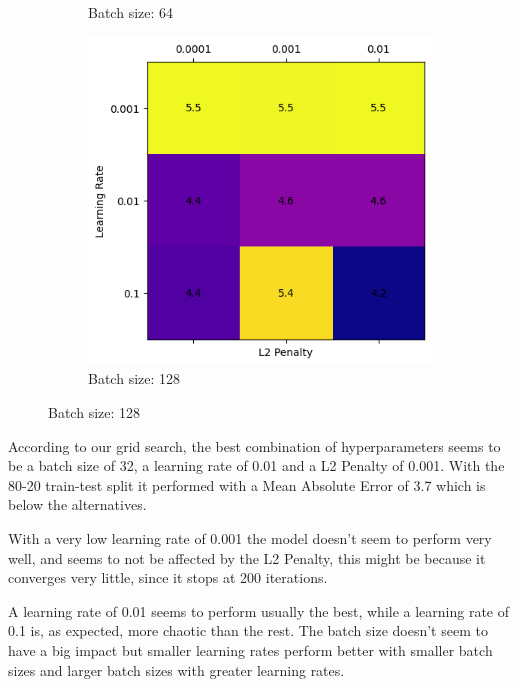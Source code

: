 \documentclass{article}
\begin{document}
\begin{enumerate}[leftmargin=\labelsep,resume]
\begin{figure}[H]
\begin{subfigure}{0.3\linewidth}
      \caption{Batch size: 64}
  \end{subfigure}
  \hfill %
  \begin{subfigure}{0.3\linewidth}
      \centering
      \includegraphics[width=\linewidth]{img/7_colorplot_128.png}
      \caption{Batch size: 128}
  \end{subfigure}
\end{figure}

According to our grid search, the best combination of hyperparameters seems to be a batch size of 32, a learning rate of 0.01 and a L2 Penalty of 0.001. With the 80-20 train-test split it performed with a Mean Absolute Error of 3.7 which is below the alternatives.

With a very low learning rate of 0.001 the model doesn't seem to perform very well, and seems to not be affected by the L2 Penalty, this might be because it converges very little, since it stops at 200 iterations.

A learning rate of 0.01 seems to perform usually the best, while a learning rate of 0.1 is, as expected, more chaotic than the rest.
The batch size doesn't seem to have a big impact but smaller learning rates perform better with smaller batch sizes and larger batch sizes with greater learning rates.

\end{enumerate}


\newpage

\end{document}
